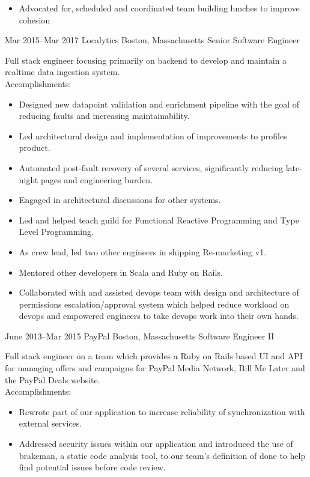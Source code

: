 \documentclass[]{friggeri-cv}
\begin{document}
\begin{entrylist}
{\begin{itemize}
      the support team, eventually becoming the de facto "goto" person
      for bugs and receiving recognition.
    \item Advocated for, scheduled and coordinated team building
      lunches to improve cohesion
    \end{itemize}
  }
  \entryalt
  {Mar 2015--Mar 2017}
  {Localytics}
  {Boston, Massachusetts}
  {Senior Software Engineer}
  {Full stack engineer focusing primarily on backend to develop and
    maintain a realtime data ingestion system. \\
    Accomplishments:
    \begin{itemize}
      \item Designed new datapoint validation and enrichment pipeline
        with the goal of reducing faults and increasing
        maintainability.
      \item Led architectural design and implementation of improvements
        to profiles product.
      \item Automated post-fault recovery of several services,
        significantly reducing late-night pages and engineering
        burden.
      \item Engaged in architectural discussions for other systems.
      \item Led and helped teach guild for Functional Reactive
        Programming and Type Level Programming.
      \item As crew lead, led two other engineers in shipping
        Re-marketing v1.
      \item Mentored other developers in Scala and Ruby on Rails.
      \item Collaborated with and assisted devops team with design and
        architecture of permissions escalation/approval system which
        helped reduce workload on devops and empowered engineers to take
        devops work into their own hands.
    \end{itemize}
  }
  \entryalt
    {June 2013--Mar 2015}
    {PayPal}
    {Boston, Massachusetts}
    {Software Engineer II}
    {Full stack engineer on a team which provides a Ruby on Rails based UI and API for managing offers and campaigns for PayPal Media Network, Bill Me Later and the PayPal Deals website. \\
    Accomplishments:
    \begin{itemize}
      \item Rewrote part of our application to increase reliability of synchronization with external services.
      \item Addressed security issues within our application and introduced the use of brakeman, a static code analysis tool, to our team's definition of done to help find potential issues before code review.

\end{itemize}}
\end{entrylist}
\end{document}
